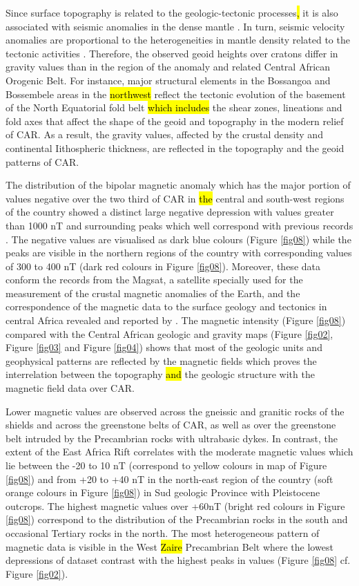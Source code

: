 \documentclass[minerals,article,submit,pdftex,moreauthors]{Definitions/mdpi}
\begin{document}
Since\hl{ }surface topography is related to the geologic-tectonic processes\hl{, }it is also associated with seismic anomalies in the dense mantle \cite{Chevrot}. In turn, seismic velocity anomalies are proportional to the heterogeneities in mantle density related to the tectonic activities \cite{Forte}. Therefore, the observed geoid heights over cratons differ in gravity values than in the region of the anomaly and related Central African Orogenic Belt. For instance, major structural elements in the Bossangoa and Bossembele areas in the \hl{northwest} reflect the tectonic evolution of the basement of the North Equatorial fold belt \hl{which includes }the shear zones, lineations and fold axes \cite{Mapoka} that affect the shape of the geoid and topography in the modern relief of CAR. As a result, the gravity values, affected by the crustal density and continental Iithospheric thickness, are reflected in the topography and the geoid patterns of CAR. 

The distribution of the bipolar magnetic anomaly which has the major portion of values negative over the two third of CAR in \hl{the }central and south-west regions of the country showed a distinct large negative depression with values greater than 1000 nT and surrounding peaks which well correspond\hl{ }with previous records \cite{Taylor2007}. The negative values are visualised as dark blue colours (Figure \ref{fig08}) while the peaks are visible in the northern regions of the country with corresponding values of 300 to 400 nT (dark red colours in Figure \ref{fig08}). Moreover, these data conform the records from the Magsat, a satellite specially used for the measurement of the crustal magnetic anomalies of the Earth, and the correspondence of the magnetic data to the surface geology and tectonics in central Africa revealed and reported by \cite{Green}. The magnetic intensity (Figure \ref{fig08}) compared with the Central African geologic and gravity maps (Figure \ref{fig02}, Figure \ref{fig03} and Figure \ref{fig04}) shows that most of the geologic units and geophysical patterns are reflected by the magnetic fields which proves the interrelation between the topography \hl{and} the geologic structure with the magnetic field data over CAR. 

Lower magnetic values are observed across the gneissic and granitic rocks of the shields and across the greenstone belts of CAR, as well as over the greenstone belt intruded by the Precambrian rocks with ultrabasic dykes. In contrast, the extent of the East Africa Rift correlates with the moderate magnetic values which lie between the -20 to  10 nT (correspond to yellow colours in map of Figure \ref{fig08}) and from +20 to +40 nT in the north-east region of the country (soft orange colours in Figure \ref{fig08}) in Sud geologic Province with Pleistocene outcrops. The highest magnetic values over +60nT (bright red colours in Figure \ref{fig08}) correspond to the distribution of the Precambrian rocks in the south and occasional Tertiary rocks in the north. The most heterogeneous pattern of magnetic data is visible in the West \hl{Zaire} Precambrian Belt where the lowest depressions of dataset contrast with the highest peaks in values (Figure \ref{fig08} cf. Figure \ref{fig02}).
\end{document}
